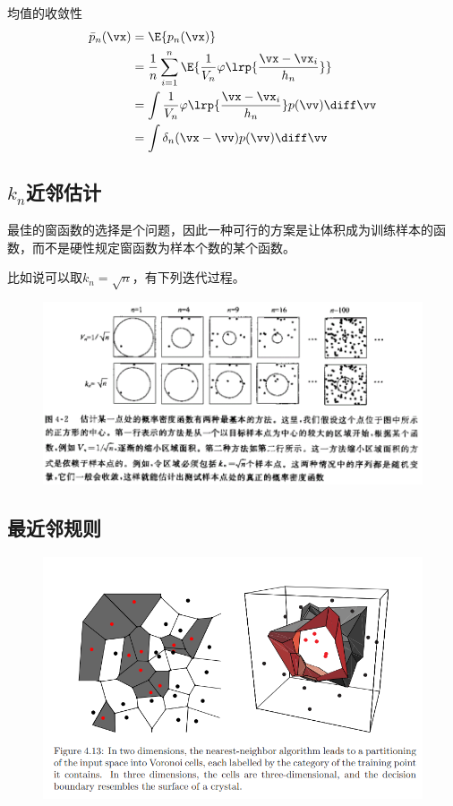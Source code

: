 均值的收敛性
\[\begin{aligned}
\bar{p}_n(\vx)&=\E{p_n(\vx)}\\
&=\frac{1}{n}\sum_{i=1}^n\E{\frac{1}{V_n}\varphi\lrp{\frac{\vx-\vx_i}{h_n}}}\\
&=\int\frac{1}{V_n}\varphi\lrp{\frac{\vx-\vx_i}{h_n}}p(\vv)\diff\vv\\
&=\int\delta_n(\vx-\vv)p(\vv)\diff\vv
\end{aligned}\]

\subsection{$k_n$近邻估计}
最佳的窗函数的选择是个问题，因此一种可行的方案是让体积成为训练样本的函数，而不是硬性规定窗函数为样本个数的某个函数。

比如说可以取$k_n=\sqrt{n}$，有下列迭代过程。
\begin{figure}[H]
\centering
\includegraphics[width=0.8\linewidth]{fig/kn-neighbor.png}
\end{figure}

\subsection{最近邻规则}
\begin{figure}[H]
\centering
\includegraphics[width=0.8\linewidth]{fig/nearest_neighbors.png}
\end{figure}

